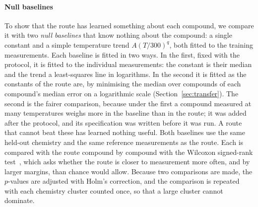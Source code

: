 \paragraph{Null baselines} To show that the route has learned something about each compound, we
compare it with two \emph{null baselines} that know nothing about the compound: a single constant
and a simple temperature trend $A(T/300)^{q}$, both fitted to the training measurements. Each
baseline is fitted in two ways. In the first, fixed with the protocol, it is fitted to the individual
measurements: the constant is their median and the trend a least-squares line in logarithms. In the
second it is fitted as the constants of the route are, by minimising the median over compounds of
each compound's median error on a logarithmic scale (Section~\ref{sec:transfer}). The second is the
fairer comparison, because under the first a compound measured at many temperatures weighs more in
the baseline than in the route; it was added after the protocol, and its specification was written
before it was run. A route that cannot beat these has learned nothing
useful. Both baselines use the same held-out chemistry and the same reference measurements as the
route. Each is compared with the route compound by compound with the Wilcoxon signed-rank
test~\cite{wilcoxon1945individual}, which asks whether the route is closer to measurement more often,
and by larger margins, than chance would allow. Because two comparisons are made, the $p$-values are
adjusted with Holm's correction, and the comparison is repeated with each chemistry cluster counted
once, so that a large cluster cannot dominate.

